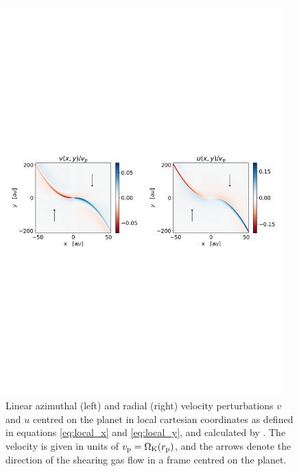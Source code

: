 \begin{figure}
    \centering
    \includegraphics[width = 0.95\textwidth]{figures/linear_box_bollati.pdf}
    \caption{Linear azimuthal (left) and radial (right) velocity perturbations $v$ and $u$ centred on the planet in local cartesian coordinates as defined in equations \ref{eq:local_x} and \ref{eq:local_y}, and calculated by \citet{bollati2021}. The velocity is given in units of $v_{\rm p} = \Omega_{\rm K}(r_{\rm p})$, and the arrows denote the direction of the shearing gas flow in a frame centred on the planet.}
    \label{fig:lin_box_bollati}
\end{figure}

